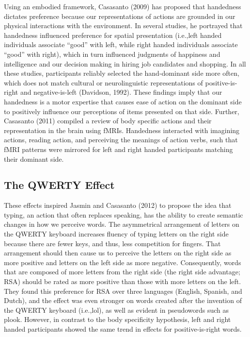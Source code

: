 \documentclass[english,man]{apa6}
\theoremstyle{definition}
\theoremstyle{definition}
\theoremstyle{definition}
\theoremstyle{remark}
\begin{document}
Using an embodied framework, Casasanto (2009) has proposed that
handedness dictates preference because our representations of actions
are grounded in our physical interactions with the environment. In
several studies, he portrayed that handedness influenced preference for
spatial presentation (i.e.,left handed individuals associate
\enquote{good} with left, while right handed individuals associate
\enquote{good} with right), which in turn influenced judgments of
happiness and intelligence and our decision making in hiring job
candidates and shopping. In all these studies, participants reliably
selected the hand-dominant side more often, which does not match
cultural or neurolinguistic representations of positive-is-right and
negative-is-left (Davidson, 1992). These findings imply that our
handedness is a motor expertise that causes ease of action on the
dominant side to positively influence our perceptions of items presented
on that side. Further, Casasanto (2011) compiled a review of body
specific actions and their representation in the brain using fMRIs.
Handedness interacted with imagining actions, reading action, and
perceiving the meanings of action verbs, such that fMRI patterns were
mirrored for left and right handed participants matching their dominant
side.

\subsection{The QWERTY Effect}\label{the-qwerty-effect}

These effects inspired Jasmin and Casasanto (2012) to propose the idea
that typing, an action that often replaces speaking, has the ability to
create semantic changes in how we perceive words. The asymmetrical
arrangement of letters on the QWERTY keyboard increases fluency of
typing letters on the right side because there are fewer keys, and thus,
less competition for fingers. That arrangement should then cause us to
perceive the letters on the right side as more positive and letters on
the left side as more negative. Consequently, words that are composed of
more letters from the right side (the right side advantage; RSA) should
be rated as more positive than those with more letters on the left. They
found this preference for RSA over three languages (English, Spanish,
and Dutch), and the effect was even stronger on words created after the
invention of the QWERTY keyboard (i.e.,lol), as well as evident in
pseudowords such as plook. However, in contrast to the body specificity
hypothesis, left and right handed participants showed the same trend in
effects for positive-is-right words.
\end{document}
